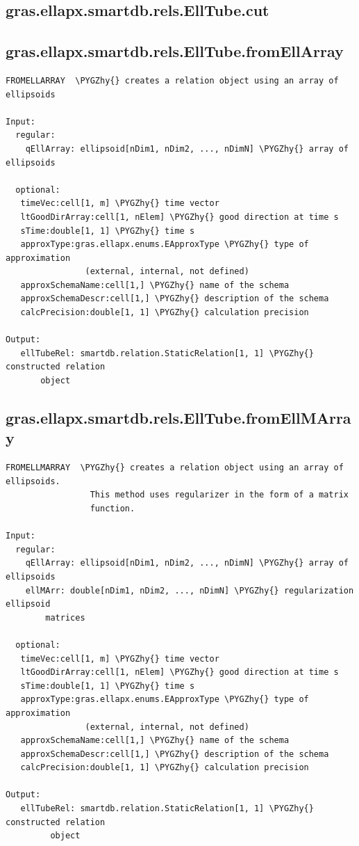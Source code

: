 \documentclass[letterpaper,10pt,english]{sphinxmanual}
\def\PYGZhy{\char`\-}
\begin{document}
\subsection{gras.ellapx.smartdb.rels.EllTube.cut}
\label{chap_functions:gras-ellapx-smartdb-rels-elltube-cut}

\subsection{gras.ellapx.smartdb.rels.EllTube.fromEllArray}
\label{chap_functions:gras-ellapx-smartdb-rels-elltube-fromellarray}
\begin{Verbatim}[commandchars=\\\{\}]
FROMELLARRAY  \PYGZhy{} creates a relation object using an array of ellipsoids

Input:
  regular:
    qEllArray: ellipsoid[nDim1, nDim2, ..., nDimN] \PYGZhy{} array of ellipsoids

  optional:
   timeVec:cell[1, m] \PYGZhy{} time vector
   ltGoodDirArray:cell[1, nElem] \PYGZhy{} good direction at time s
   sTime:double[1, 1] \PYGZhy{} time s
   approxType:gras.ellapx.enums.EApproxType \PYGZhy{} type of approximation
                (external, internal, not defined)
   approxSchemaName:cell[1,] \PYGZhy{} name of the schema
   approxSchemaDescr:cell[1,] \PYGZhy{} description of the schema
   calcPrecision:double[1, 1] \PYGZhy{} calculation precision

Output:
   ellTubeRel: smartdb.relation.StaticRelation[1, 1] \PYGZhy{} constructed relation
       object
\end{Verbatim}


\subsection{gras.ellapx.smartdb.rels.EllTube.fromEllMArray}
\label{chap_functions:gras-ellapx-smartdb-rels-elltube-fromellmarray}
\begin{Verbatim}[commandchars=\\\{\}]
FROMELLMARRAY  \PYGZhy{} creates a relation object using an array of ellipsoids.
                 This method uses regularizer in the form of a matrix
                 function.

Input:
  regular:
    qEllArray: ellipsoid[nDim1, nDim2, ..., nDimN] \PYGZhy{} array of ellipsoids
    ellMArr: double[nDim1, nDim2, ..., nDimN] \PYGZhy{} regularization ellipsoid
        matrices

  optional:
   timeVec:cell[1, m] \PYGZhy{} time vector
   ltGoodDirArray:cell[1, nElem] \PYGZhy{} good direction at time s
   sTime:double[1, 1] \PYGZhy{} time s
   approxType:gras.ellapx.enums.EApproxType \PYGZhy{} type of approximation
                (external, internal, not defined)
   approxSchemaName:cell[1,] \PYGZhy{} name of the schema
   approxSchemaDescr:cell[1,] \PYGZhy{} description of the schema
   calcPrecision:double[1, 1] \PYGZhy{} calculation precision

Output:
   ellTubeRel: smartdb.relation.StaticRelation[1, 1] \PYGZhy{} constructed relation
         object
\end{Verbatim}
\end{document}
